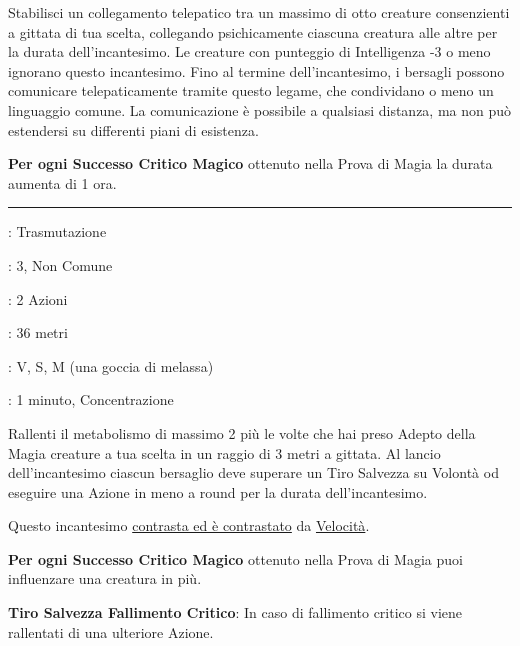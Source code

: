 \begin{multicols}{2}
Stabilisci un collegamento telepatico tra un massimo di otto creature consenzienti a gittata di tua scelta, collegando psichicamente ciascuna creatura alle altre per la durata dell'incantesimo. Le creature con punteggio di Intelligenza -3 o meno ignorano questo incantesimo. Fino al termine dell'incantesimo, i bersagli possono comunicare telepaticamente tramite questo legame, che condividano o meno un linguaggio comune. La comunicazione è possibile a qualsiasi distanza, ma non può estendersi su differenti piani di esistenza.

\textbf{Per ogni Successo Critico Magico} ottenuto nella Prova di Magia la durata aumenta di 1 ora.

\smallskip\noindent\rule{\linewidth}{2pt} \hypertarget{Lentezza}{}\medskip{}\hypertarget{lentezza}{}
\noindent
\begin{description}[noitemsep, topsep=0pt, parsep=0pt, partopsep=0pt, leftmargin=0cm, labelwidth=2.8cm]
	\item[\textbf{Lista di Magia}]: Trasmutazione
	\item[\textbf{Livello}]: 3, Non Comune
	\item[\textbf{T. di Lancio}]: 2 Azioni
	\item[\textbf{Gittata}]: 36 metri
	\item[\textbf{Componenti}]: V, S, M (una goccia di melassa)
	\item[\textbf{Durata}]: 1 minuto, Concentrazione
\end{description}

Rallenti il metabolismo di massimo 2 più le volte che hai preso Adepto della Magia creature a tua scelta in un raggio di 3 metri a gittata. Al lancio dell'incantesimo ciascun bersaglio deve superare un Tiro Salvezza su Volontà od eseguire una Azione in meno a round per la durata dell'incantesimo.

Questo incantesimo \hyperlink{contrastareincantesimi}{contrasta ed è contrastato} da \hyperlink{Velocità}{Velocità}.

\textbf{Per ogni Successo Critico Magico} ottenuto nella Prova di Magia puoi influenzare una creatura in più.

\textbf{Tiro Salvezza Fallimento Critico}: In caso di fallimento critico si viene rallentati di una ulteriore Azione.


\end{multicols}
